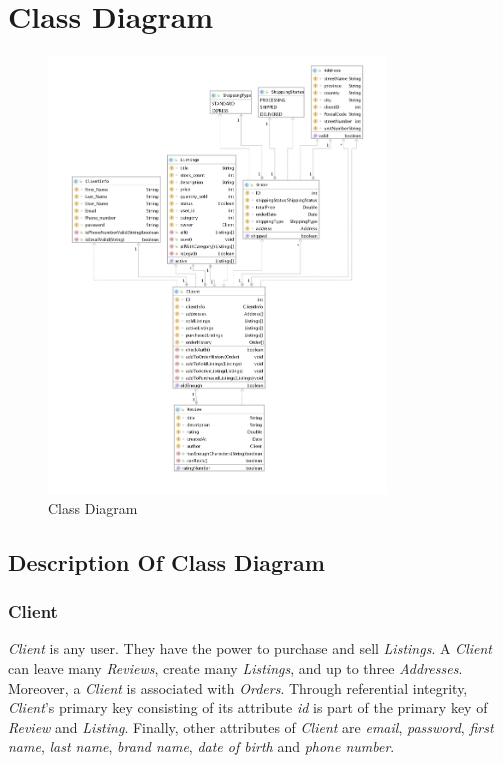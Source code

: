 \documentclass[11pt]{article}
\newcounter{use case ID}
\begin{document}
\section{Class Diagram}
\begin{figure}[ht!]
    \centering
    \includegraphics[width=0.8\textwidth]{Diagrams/Class/class_diagram.png}
    \caption{Class Diagram}
    \label{fig: Class diagram}
\end{figure}

\subsection{Description Of Class Diagram}
\subsubsection{Client}
\textit{Client} is any user. They have the power to purchase and sell \textit{Listings}. A \textit{Client} can leave many \textit{Reviews}, create many \textit{Listings}, and up to three \textit{Addresses}. Moreover, a \textit{Client} is associated with \textit{Orders}. Through referential integrity, \textit{Client}'s primary key consisting of its attribute \textit{id} is part of the primary key of \textit{Review} and \textit{Listing}. Finally, other attributes of \textit{Client} are \textit{email}, \textit{password}, \textit{first name}, \textit{last name}, \textit{brand name}, \textit{date of birth} and \textit{phone number}.
\end{document}
